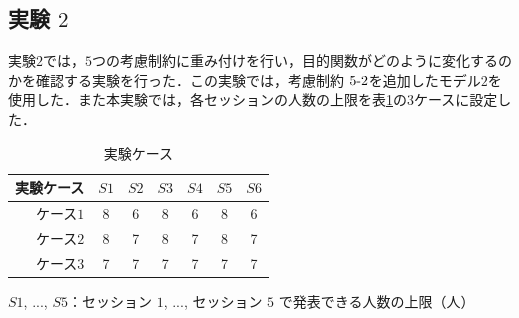 \documentclass[a4paper,12pt,fleqn]{jarticle}
\begin{document}
\subsection{実験 $2$}
実験$2$では，$5$つの考慮制約に重み付けを行い，目的関数がどのように変化するのかを確認する実験を行った．この実験では，考慮制約 $5\mathchar`-2$を追加したモデル$2$を使用した．また本実験では，各セッションの人数の上限を表\ref{tb:jk}の$3$ケースに設定した．
\begin{table}[H]
  \begin{center}
    \caption{実験ケース}
    \label{tb:jk}
    \begin{tabular}{r|cccccc} \toprule
     実験ケース & $S1$ & $S2$ & $S3$ & $S4$ & $S5$ & $S6$\\ \toprule
     ケース$1$ & 8 & 6 & 8 & 6 & 8 & 6\\
     ケース$2$ & 8 & 7 & 8 & 7 & 8 & 7 \\ 
     ケース$3$ & 7 & 7 & 7 & 7 & 7 & 7 \\ \bottomrule
      \end{tabular}
  \end{center}
 \hspace{2cm} $ S1$, ..., $S5$：セッション $1$, ..., セッション $5$ で発表できる人数の上限（人）
\end{table}
\end{document}
